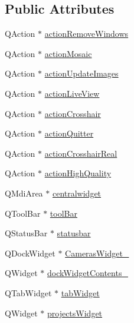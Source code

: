 \subsection*{Public Attributes}
\begin{DoxyCompactItemize}
\item 
Q\+Action $\ast$ \mbox{\hyperlink{class_ui___main_window_a8560857e3b9016cef6bab384f17d38c0}{action\+Remove\+Windows}}
\item 
Q\+Action $\ast$ \mbox{\hyperlink{class_ui___main_window_a75ce9cee1d1ff2e75c59d92cb2303a2b}{action\+Mosaic}}
\item 
Q\+Action $\ast$ \mbox{\hyperlink{class_ui___main_window_a5e565d3d7403e3ce05d626549b683ab7}{action\+Update\+Images}}
\item 
Q\+Action $\ast$ \mbox{\hyperlink{class_ui___main_window_ae615c354eaf9ca400c2ec2036ddc835f}{action\+Live\+View}}
\item 
Q\+Action $\ast$ \mbox{\hyperlink{class_ui___main_window_a3d6e96b03d68075ee7646a117bf8056d}{action\+Crosshair}}
\item 
Q\+Action $\ast$ \mbox{\hyperlink{class_ui___main_window_a3d416f0c4ac4511347e24a06d4f58e85}{action\+Quitter}}
\item 
Q\+Action $\ast$ \mbox{\hyperlink{class_ui___main_window_a1c4d8bc2f93083cc5fb830c76c181ce7}{action\+Crosshair\+Real}}
\item 
Q\+Action $\ast$ \mbox{\hyperlink{class_ui___main_window_abb36f179bbcc871b7429f8379b7e871e}{action\+High\+Quality}}
\item 
Q\+Mdi\+Area $\ast$ \mbox{\hyperlink{class_ui___main_window_a6c0e7efe3f8393c6a0f209d529c5073d}{centralwidget}}
\item 
Q\+Tool\+Bar $\ast$ \mbox{\hyperlink{class_ui___main_window_ab84dc49349f514d7b7d3fe8e78de069b}{tool\+Bar}}
\item 
Q\+Status\+Bar $\ast$ \mbox{\hyperlink{class_ui___main_window_a1687cceb1e2787aa1f83e50433943a91}{statusbar}}
\item 
Q\+Dock\+Widget $\ast$ \mbox{\hyperlink{class_ui___main_window_a1aaf90e1534b79b416ace92a7fa729b6}{Cameras\+Widget\+\_}}
\item 
Q\+Widget $\ast$ \mbox{\hyperlink{class_ui___main_window_a9a843dd5296065a2d320fa8f083e4b59}{dock\+Widget\+Contents\+\_}}
\item 
Q\+Tab\+Widget $\ast$ \mbox{\hyperlink{class_ui___main_window_a3260b943854b841c986f47c4726ee7f9}{tab\+Widget}}
\item 
Q\+Widget $\ast$ \mbox{\hyperlink{class_ui___main_window_a1d00c82892350d4742af7119a38cece6}{projects\+Widget}}

\end{DoxyCompactItemize}
